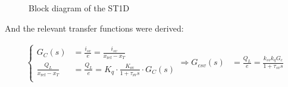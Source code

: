 \documentclass[  10pt, twoside]{report} %
\numberwithin{equation}{chapter}
\begin{document}
\begin{figure}[H]




    \caption{Block diagram of the ST1D}%
    \label{fig_clean_block_force_output}
\end{figure}

 And the relevant transfer functions were derived:

\begin{align}
\left\{
    \begin{aligned}
        G_C(s) &= \frac{i_{sv}}{e} = \frac{i_{sv}}{x_{\text{ref}} - x_T} \\
        \frac{Q_L}{x_{\text{ref}} - x_T} &= \frac{Q_L}{e} = K_q \cdot \frac{K_{\text{sv}}}{1 + \tau_{\text{sv}} s} \cdot G_C(s) \\
    \end{aligned}
\right.
\Longrightarrow G_{csv}(s) &=  \frac{Q_L}{e} = \frac{k_{sv} k_q G_c}{1 + \tau_{sv} s} 
\end{align}
\end{document}

